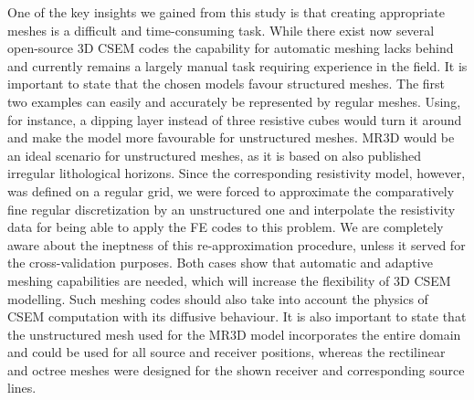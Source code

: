 \documentclass[onecolumn,extra,camera]{gji}
\begin{document}
One of the key insights we gained from this study is that creating appropriate meshes is a difficult and time-consuming task. While there exist now several open-source 3D CSEM codes the capability for automatic meshing lacks behind and currently remains a largely manual task requiring experience in the field. It is important to state that the chosen models favour structured meshes. The first two examples can easily and accurately be represented by regular meshes. Using, for instance, a dipping layer instead of three resistive cubes would turn it around and make the model more favourable for unstructured meshes. MR3D would be an ideal scenario for unstructured meshes, as it is based on also published irregular lithological horizons. Since the corresponding resistivity model, however, was defined on a regular grid, we were forced to approximate the comparatively fine regular discretization by an unstructured one and interpolate the resistivity data for being able to apply the FE codes to this problem. We are completely aware about the ineptness of this re-approximation procedure, unless it served for the cross-validation purposes. Both cases show that automatic and adaptive meshing capabilities are needed, which will increase the flexibility of 3D CSEM modelling. Such meshing codes should also take into account the physics of CSEM computation with its diffusive behaviour. It is also important to state that the unstructured mesh used for the MR3D model incorporates the entire domain and could be used for all source and receiver positions, whereas the rectilinear and octree meshes were designed for the shown receiver and corresponding source lines.
\end{document}
